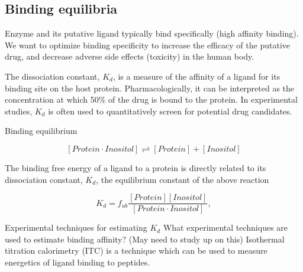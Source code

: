 \subsection{Binding equilibria}
\begin{outline}
	\1 Enzyme and its putative ligand typically bind specifically (high affinity binding).  We want to optimize binding specificity to increase the efficacy of the putative drug, and decrease adverse side effects (toxicity) in the human body.

	\1 The dissociation constant, $K_d$, is a measure of the affinity of a ligand for its binding site on the host protein. Pharmacologically, it can be interpreted as the concentration at which 50\% of the drug is bound to the protein. In experimental studies, $K_d$ is often used to quantitatively screen for potential drug candidates. 

	\1 Binding equilibrium

    \begin{equation}
      \left[ Protein\cdot Inositol \right] 
      \rightleftharpoons 
      \left[ Protein \right]+\left[ Inositol \right]
    \end{equation}
  
    
	\1 The binding free energy of a ligand to a protein is directly related to its dissociation constant, $K_d$, the equilibrium constant of the above reaction

     \begin{equation}
        K_{d} = f_{ub}\frac{\left[ Protein \right]\left[ Inositol \right]}{\left[Protein \cdot Inositol\right]},
     \end{equation}
     
	\1 Experimental techniques for estimating $K_d$
		\2 What experimental techniques are used to estimate binding affinity? (May need to study up on this)
		\2 Isothermal titration calorimetry (ITC) is a technique which can be used to measure energetics of ligand binding to peptides.
\end{outline}


